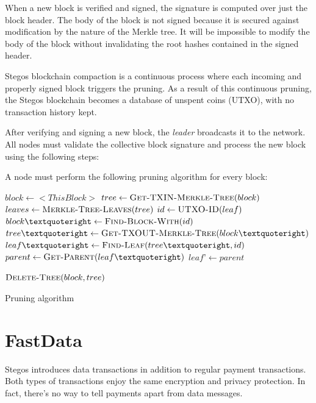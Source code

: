 \documentclass[8pt,fleqn,openany]{book}
\begin{document}
When a new block is verified and signed, the signature is computed over just the block header. The body of the block is not signed because it is secured against modification by the nature of the Merkle tree. It will be impossible to modify the body of the block without invalidating the root hashes contained in the signed header.

Stegos blockchain compaction is a continuous process where each incoming and properly signed block triggers the pruning. As a result of this continuous pruning, the Stegos blockchain becomes a database of unspent coins (UTXO), with no transaction history kept.

After verifying and signing a new block, the \textit{leader} broadcasts it to the network. All nodes must validate the collective block signature and process the new block using the following steps:

A node must perform the following pruning algorithm for every block:

\begin{algorithm}
\begin{algorithmic}
\State $block \gets <This Block>$
\State $tree \gets \Call{Get-TXIN-Merkle-Tree}{block}$
\State $leaves \gets \Call{Merkle-Tree-Leaves}{tree}$
	\State $id \gets \Call{UTXO-ID}{leaf}$
	\State $block’ \gets \Call{Find-Block-With}{id}$
	\State $tree’ \gets \Call{Get-TXOUT-Merkle-Tree}{block’}$
	\State $leaf’ \gets \Call{Find-Leaf}{tree’, id}$
	\State {} 
		\State $parent \gets \Call{Get-Parent}{leaf’}$
		\State {}
		\State {} 
		\State {}
		\State $leaf’ \gets parent$
	\EndFor
\EndFor

	\State $\Call{Delete-Tree}{block, tree}$ 
\EndIf

\end{algorithmic}
\caption{Pruning algorithm}
\label{code:pruning}
\end{algorithm}

\section{FastData}
Stegos introduces data transactions in addition to regular payment transactions. Both types of transactions enjoy the same encryption and privacy protection. In fact, there’s no way to tell payments apart from data messages. 
\end{document}
